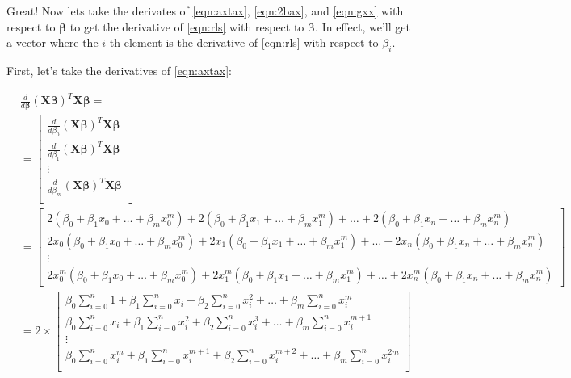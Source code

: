 \documentclass{article}
\newcommand{\X}{\mathbf{X}}
\newcommand{\B}{\boldsymbol\beta} %
\begin{document}
Great! Now lets take the derivates of \ref{eqn:axtax}, \ref{eqn:2bax}, and \ref{eqn:gxx} with respect to $\B$ to get the derivative of \ref{eqn:rls} with respect to $\B$. In effect, we'll get a vector where the $i$-th element is the derivative of \ref{eqn:rls} with respect to $\beta_i$.

First, let's take the derivatives of \ref{eqn:axtax}:

\begin{equation}
\begin{split}
    & \frac{d}{d\B} (\X\B)^T \X\B = \\
    & =
    \begin{bmatrix}
        \frac{d}{d \beta_0} (\X\B)^T \X\B \\
        \frac{d}{d \beta_1} (\X\B)^T \X\B \\
        \vdots \\
        \frac{d}{d \beta_m} (\X\B)^T \X\B \\
    \end{bmatrix}\\
    & =
    \begin{bmatrix}
        2(\beta_0 + \beta_1 x_0 + \dots + \beta_m x_0 ^ m) + 2(\beta_0 + \beta_1 x_1 + \dots + \beta_m x_1 ^ m) + \ldots + 2(\beta_0 + \beta_1 x_n + \dots + \beta_m x_n ^ m)\\
        2 x_0(\beta_0 + \beta_1 x_0 + \dots + \beta_m x_0 ^ m) + 2 x_1(\beta_0 + \beta_1 x_1 + \dots + \beta_m x_1 ^ m) + \ldots + 2 x_n(\beta_0 + \beta_1 x_n + \dots + \beta_m x_n ^ m)\\
        \vdots \\
        2 x_0^m(\beta_0 + \beta_1 x_0 + \dots + \beta_m x_0 ^ m) + 2 x_1^m(\beta_0 + \beta_1 x_1 + \dots + \beta_m x_1 ^ m) + \ldots + 2 x_n^m(\beta_0 + \beta_1 x_n + \dots + \beta_m x_n ^ m)
    \end{bmatrix}\\
    & = 2 \times
    \begin{bmatrix}
        \beta_0 \sum_{i=0}^{n} 1 + \beta_1 \sum_{i=0}^{n} x_i + \beta_2 \sum_{i=0}^{n} x_i^2 + \ldots + \beta_m \sum_{i=0}^{n} x_i ^ m\\
        \beta_0 \sum_{i=0}^{n} x_i + \beta_1 \sum_{i=0}^{n} x_i^2 + \beta_2 \sum_{i=0}^{n} x_i^3 + \ldots + \beta_m \sum_{i=0}^{n} x_i ^ {m+1}\\
        \vdots \\
        \beta_0 \sum_{i=0}^{n} x_i^m + \beta_1 \sum_{i=0}^{n} x_i^{m+1} + \beta_2 \sum_{i=0}^{n} x_i^{m+2} + \ldots + \beta_m \sum_{i=0}^{n} x_i ^ {2m}\\

\end{bmatrix}
\end{split}
\end{equation}
\end{document}

